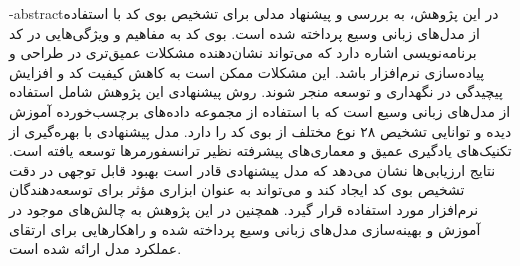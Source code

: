\fa-abstract{در این پژوهش، به بررسی و پیشنهاد مدلی برای تشخیص بوی کد با استفاده از مدل‌های زبانی وسیع پرداخته شده است. بوی کد به مفاهیم و ویژگی‌هایی در کد برنامه‌نویسی اشاره دارد که می‌تواند نشان‌دهنده مشکلات عمیق‌تری در طراحی و پیاده‌سازی نرم‌افزار باشد. این مشکلات ممکن است به کاهش کیفیت کد و افزایش پیچیدگی در نگهداری و توسعه منجر شوند. روش پیشنهادی این پژوهش شامل استفاده از مدل‌های زبانی وسیع است که با استفاده از مجموعه داده‌های برچسب‌خورده آموزش دیده و توانایی تشخیص ۲۸ نوع مختلف از بوی کد را دارد. مدل پیشنهادی با بهره‌گیری از تکنیک‌های یادگیری عمیق و معماری‌های پیشرفته نظیر ترانسفورمرها توسعه یافته است. نتایج ارزیابی‌ها نشان می‌دهد که مدل پیشنهادی قادر است بهبود قابل توجهی در دقت تشخیص بوی کد ایجاد کند و می‌تواند به عنوان ابزاری مؤثر برای توسعه‌دهندگان نرم‌افزار مورد استفاده قرار گیرد. همچنین در این پژوهش به چالش‌های موجود در آموزش و بهینه‌سازی مدل‌های زبانی وسیع پرداخته شده و راهکارهایی برای ارتقای عملکرد مدل ارائه شده است.}

\abstractPage

\newpage\clearpage
